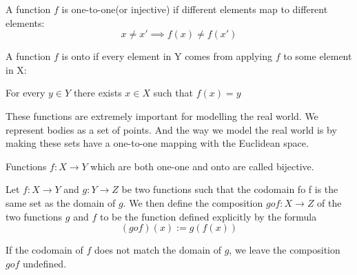 \documentclass[11pt]{report}
\begin{document}
\begin{definition}
	A function $f$ is one-to-one(or injective) if different elements map to different elements:
	\[
		x \ne x' \implies f(x) \ne f(x')
	\]
\end{definition}
\begin{definition}
	A function $f$ is onto if every element in Y comes from applying $f$ to some element in X:

	For every $y \in Y$ there exists $x \in X$ such that $f(x) = y$
\end{definition}
These functions are extremely important for modelling the real world. We represent bodies as a set of points. And the way we model the real world is by making these sets have a one-to-one mapping with the Euclidean space.
\begin{definition}
	Functions $f: X \rightarrow Y$ which are both one-one and onto are called bijective.
\end{definition}

\begin{definition}
	Let $f: X \rightarrow Y$ and $g: Y \rightarrow Z$ be two functions such that the codomain fo f is the same set as the domain of $g$. We then define the composition $g o f: X \rightarrow Z$ of the two functions $g$ and $f$ to be the function defined explicitly by the formula
	\[
		(g o f)(x) := g(f(x))
	\]

	If the codomain of $f$ does not match the domain of $g$, we leave the composition $g o f$ undefined.
\end{definition}
\end{document}
